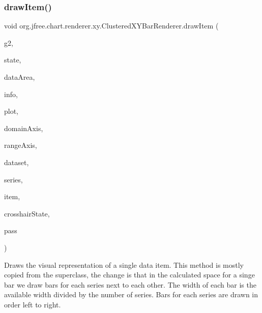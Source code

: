 \subsubsection{\texorpdfstring{draw\+Item()}{drawItem()}}
{\footnotesize\ttfamily void org.\+jfree.\+chart.\+renderer.\+xy.\+Clustered\+X\+Y\+Bar\+Renderer.\+draw\+Item (\begin{DoxyParamCaption}\item[{Graphics2D}]{g2,  }\item[{\mbox{\hyperlink{classorg_1_1jfree_1_1chart_1_1renderer_1_1xy_1_1_x_y_item_renderer_state}{X\+Y\+Item\+Renderer\+State}}}]{state,  }\item[{Rectangle2D}]{data\+Area,  }\item[{\mbox{\hyperlink{classorg_1_1jfree_1_1chart_1_1plot_1_1_plot_rendering_info}{Plot\+Rendering\+Info}}}]{info,  }\item[{\mbox{\hyperlink{classorg_1_1jfree_1_1chart_1_1plot_1_1_x_y_plot}{X\+Y\+Plot}}}]{plot,  }\item[{\mbox{\hyperlink{classorg_1_1jfree_1_1chart_1_1axis_1_1_value_axis}{Value\+Axis}}}]{domain\+Axis,  }\item[{\mbox{\hyperlink{classorg_1_1jfree_1_1chart_1_1axis_1_1_value_axis}{Value\+Axis}}}]{range\+Axis,  }\item[{\mbox{\hyperlink{interfaceorg_1_1jfree_1_1data_1_1xy_1_1_x_y_dataset}{X\+Y\+Dataset}}}]{dataset,  }\item[{int}]{series,  }\item[{int}]{item,  }\item[{\mbox{\hyperlink{classorg_1_1jfree_1_1chart_1_1plot_1_1_crosshair_state}{Crosshair\+State}}}]{crosshair\+State,  }\item[{int}]{pass }\end{DoxyParamCaption})}

Draws the visual representation of a single data item. This method is mostly copied from the superclass, the change is that in the calculated space for a singe bar we draw bars for each series next to each other. The width of each bar is the available width divided by the number of series. Bars for each series are drawn in order left to right.


